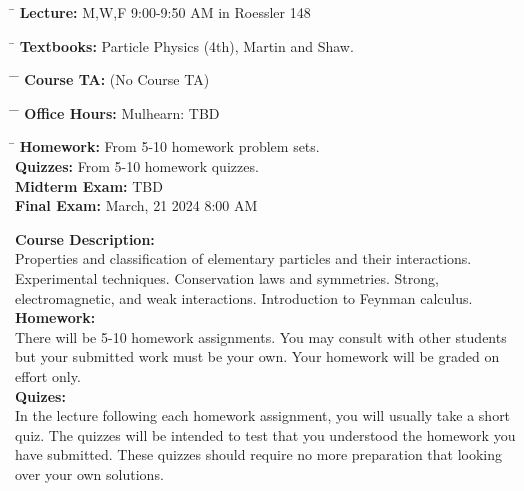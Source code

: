 \documentclass[12pt]{article}
\begin{document}
\noindent
\begin{tabbing}
\hspace*{8em} \= \kill 
\textbf {Lecture:} \> M,W,F 9:00-9:50 AM in Roessler 148 
\end{tabbing}
\noindent
\begin{tabbing}
\hspace*{8em} \= \kill 
\textbf{Textbooks:} \> Particle Physics (4th), Martin and Shaw.\\
\end{tabbing}
\noindent
\begin{tabbing}
\hspace*{8em}\= \hspace*{10em} \= \kill 
\textbf{Course TA:} \> (No Course TA)
\end{tabbing}
\noindent
\begin{tabbing}
\hspace*{8em}\= \hspace*{10em} \= \kill 
\textbf{Office Hours:}
    \> Mulhearn: \> TBD
\end{tabbing}
\noindent
\begin{tabbing}
\hspace*{12em}\= \kill 
\textbf{Homework:} \> From 5-10 homework problem sets.\\
\textbf{Quizzes:} \> From 5-10 homework quizzes.\\
\textbf{Midterm Exam:} \> TBD\\
\textbf{Final Exam:} \>  March, 21 2024 8:00 AM\\
\end{tabbing}
\noindent
\textbf {Course Description:}\\
Properties and classification of elementary particles and their interactions. Experimental techniques. Conservation laws and symmetries. Strong, electromagnetic, and weak interactions. Introduction to Feynman calculus.\\[3pt]

\noindent
\textbf{Homework:}\\
There will be 5-10 homework assignments.  You may consult with other students but your submitted work must be your own.  Your homework will be graded on effort only.\\[3pt]

\noindent
\textbf{Quizes:}\\
In the lecture following each homework assignment, you will usually take a short quiz.  The quizzes will be intended to test that you understood the homework you have submitted.  These quizzes should require no more preparation that looking over your own solutions.\\[3pt]
\end{document}
